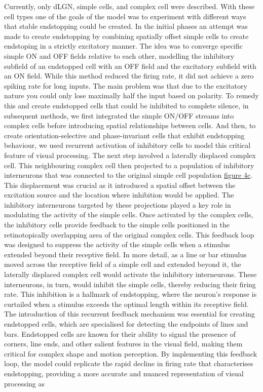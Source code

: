 \documentclass[12pt]{article}
\begin{document}
Currently, only dLGN, simple cells, and complex cell were described. With these cell types one of the goals of the model was to experiment with different ways that stable endstopping could be created. In the initial phases an attempt was made to create endstopping by combining spatially offset simple cells to create endstoping in a strictly excitatory manner. The idea was to converge specific simple ON and OFF fields relative to each other, modelling the inhibitory subfield of an endstopped cell with an OFF field and the excitatory subfield with an ON field. While this method reduced the firing rate, it did not achieve a zero spiking rate for long inputs. The main problem was that due to the excitatory nature you could only lose maximally half the input based on polarity. To remedy this and create endstopped cells that could be inhibited to complete silence, in subsequent methods, we first integrated the simple ON/OFF streams into complex cells before introducing spatial relationships between cells. And then, to create orientation-selective and phase-invariant cells that exhibit endstopping behaviour, we used recurrent activation of inhibitory cells to model this critical feature of visual processing. The next step involved a laterally displaced complex cell. This neighbouring complex cell then projected to a population of inhibitory interneurons that was connected to the original simple cell population \hyperref[fig:LIF_Overview]{figure 4c}. This displacement was crucial as it introduced a spatial offset between the excitation source and the location where inhibition would be applied. The inhibitory interneurons targeted by these projections played a key role in modulating the activity of the simple cells. Once activated by the complex cells, the inhibitory cells provide feedback to the simple cells positioned in the retinotopically overlapping area of the original complex cells. This feedback loop was designed to suppress the activity of the simple cells when a stimulus extended beyond their receptive field. In more detail, as a line or bar stimulus moved across the receptive field of a simple cell and extended beyond it, the laterally displaced complex cell would activate the inhibitory interneurons. These interneurons, in turn, would inhibit the simple cells, thereby reducing their firing rate. This inhibition is a hallmark of endstopping, where the neuron's response is curtailed when a stimulus exceeds the optimal length within its receptive field. The introduction of this recurrent feedback mechanism was essential for creating endstopped cells, which are specialised for detecting the endpoints of lines and bars. Endstopped cells are known for their ability to signal the presence of corners, line ends, and other salient features in the visual field, making them critical for complex shape and motion perception. By implementing this feedback loop, the model could replicate the rapid decline in firing rate that characterises endstopping, providing a more accurate and nuanced representation of visual processing as 
\end{document}
